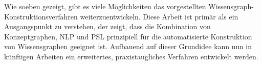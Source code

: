 Wie soeben gezeigt, gibt es viele Möglichkeiten das vorgestellten Wissensgraph-Konstruktionsverfahren weiterzuentwickeln.
Diese Arbeit ist primär als ein Ausgangspunkt zu verstehen, der zeigt, dass die Kombination von Konzeptgraphen, NLP und PSL prinzipiell für die automatisierte Konstruktion von Wissensgraphen geeignet ist.
Aufbauend auf dieser Grundidee kann nun in künftigen Arbeiten ein erweitertes, praxistaugliches Verfahren entwickelt werden.
